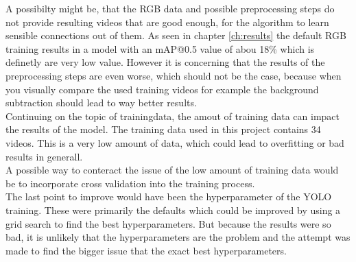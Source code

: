 A possibilty might be, that the RGB data and possible preprocessing steps do not provide resulting videos that are good enough, for the algorithm to learn sensible connections out of them. As seen in chapter \ref{ch:results} the default RGB training results in a model with an mAP@0.5 value of abou 18\% which is definetly are very low value. However it is concerning that the results of the preprocessing steps are even worse, which should not be the case, because when you visually compare the used training videos for example the background subtraction should lead to way better results. \\
Continuing on the topic of trainingdata, the amout of training data can impact the results of the model. The training data used in this project contains 34 videos. This is a very low amount of data, which could lead to overfitting or bad results in generall. \\
A possible way to conteract the issue of the low amount of training data would be to incorporate cross validation into the training process.\\
The last point to improve would have been the hyperparameter of the YOLO training. These were primarily the defaults which could be improved by using a grid search to find the best hyperparameters. But because the results were so bad, it is unlikely that the hyperparameters are the problem and the attempt was made to find the bigger issue that the exact best hyperparameters.


